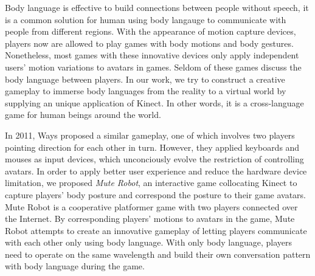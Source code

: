 \documentclass{chi-ext}
\begin{document}
Body language is effective to build connections between people without speech, it is a common solution for human using body langauge to communicate with people from different regions.
With the appearance of motion capture devices, players now are allowed to play games with body motions and body gestures.
Nonetheless, most games with these innovative devices only apply independent users' motion variations to avatars in games. 
Seldom of these games discuss the body language between players.
In our work, we try to construct a creative gameplay to immerse body languages from the reality to a virtual world by supplying an unique application of Kinect\cite{Kinect}.
In other words, it is a cross-language game for human beings around the world.

In 2011, Ways\cite{Ways} proposed a similar gameplay, one of which involves two players pointing direction for each other in turn.
However, they applied keyboards and mouses as input devices, which unconciously evolve the restriction of controlling avatars. 
In order to apply better user experience and reduce the hardware device limitation, we proposed {\it Mute Robot}, an interactive game collocating Kinect to capture players' body posture and correspond the posture to their game avatars. 
Mute Robot is a cooperative platformer game with two players connected over the Internet.
By corresponding players' motions to avatars in the game, Mute Robot attempts to create an innovative gameplay of letting players communicate with each other only using body language.
With only body language, players need to operate on the same wavelength and build their own conversation pattern with body language during the game.
\end{document}
